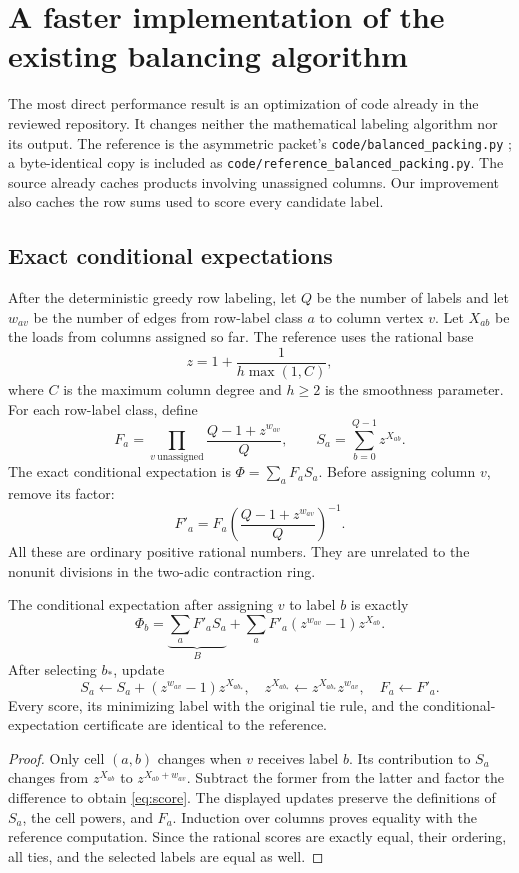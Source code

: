 \section{A faster implementation of the existing balancing algorithm}
\label{sec:packing-code}

The most direct performance result is an optimization of code already in the
reviewed repository. It changes neither the mathematical labeling algorithm
nor its output. The reference is the asymmetric packet's
\texttt{code/balanced\_packing.py} \cite{asymmetric}; a byte-identical copy is
included as \texttt{code/reference\_balanced\_packing.py}. The source already
caches products involving unassigned columns. Our improvement also caches
the row sums used to score every candidate label.

\subsection{Exact conditional expectations}

After the deterministic greedy row labeling, let $Q$ be the number of
labels and let $w_{av}$ be the number of edges from row-label class $a$ to
column vertex $v$. Let $X_{ab}$ be the loads from columns assigned so far.
The reference uses the rational base
\[
 z=1+\frac1{h\max(1,C)},
\]
where $C$ is the maximum column degree and $h\ge2$ is the smoothness
parameter. For each row-label class, define
\[
 F_a=\prod_{v\ \mathrm{unassigned}}\frac{Q-1+z^{w_{av}}}{Q},
 \qquad S_a=\sum_{b=0}^{Q-1}z^{X_{ab}}.
\]
The exact conditional expectation is $\Phi=\sum_a F_aS_a$.
Before assigning column $v$, remove its factor:
\[
 F'_a=F_a\left(\frac{Q-1+z^{w_{av}}}{Q}\right)^{-1}.
\]
All these are ordinary positive rational numbers. They are unrelated to
the nonunit divisions in the two-adic contraction ring.

\begin{proposition}
\label{prop:scores}
The conditional expectation after assigning $v$ to label $b$ is exactly
\begin{equation}\label{eq:score}
 \Phi_b=\underbrace{\sum_a F'_aS_a}_{B}
       +\sum_a F'_a(z^{w_{av}}-1)z^{X_{ab}}.
\end{equation}
After selecting $b_*$, update
\[
 S_a\leftarrow S_a+(z^{w_{av}}-1)z^{X_{ab_*}},\quad
 z^{X_{ab_*}}\leftarrow z^{X_{ab_*}}z^{w_{av}},\quad
 F_a\leftarrow F'_a.
\]
Every score, its minimizing label with the original tie rule, and the
conditional-expectation certificate are identical to the reference.
\end{proposition}
\begin{proof}
Only cell $(a,b)$ changes when $v$ receives label $b$. Its contribution
to $S_a$ changes from $z^{X_{ab}}$ to $z^{X_{ab}+w_{av}}$.
Subtract the former from the latter and factor the difference to obtain
\eqref{eq:score}. The displayed updates preserve the definitions of $S_a$,
the cell powers, and $F_a$. Induction over columns proves equality with
the reference computation. Since the rational scores are exactly equal,
their ordering, all ties, and the selected labels are equal as well.
\end{proof}

